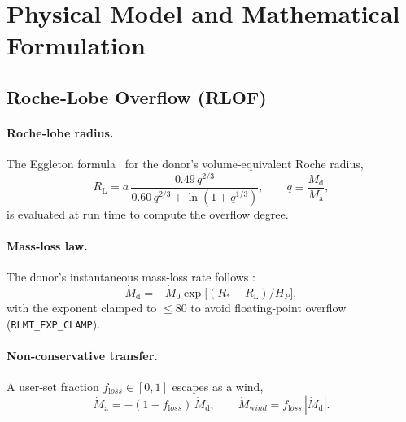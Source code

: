 \documentclass[11pt]{article}
\begin{document}
\section{Physical Model and Mathematical Formulation}

\subsection{Roche‑Lobe Overflow (RLOF)}
\label{sec:RLOF}

\paragraph{Roche‑lobe radius.}
The Eggleton formula~\cite{Eggleton1983} for the donor’s
volume‑equivalent Roche radius,
\begin{equation}
R_{\mathrm L}
 = a\,
   \frac{0.49\,q^{2/3}}{0.60\,q^{2/3}+\ln(1+q^{1/3})},
\qquad
q\equiv\frac{M_{\mathrm d}}{M_{\mathrm a}},
\label{eq:Eggleton}
\end{equation}
is evaluated at run time to compute the overflow degree.

\paragraph{Mass‑loss law.}
The donor’s instantaneous mass‑loss rate follows
\citet{Ritter1988}:
\begin{equation}
\dot M_{\mathrm d}
 = -\dot M_0
   \exp\!\bigl[(R_{*}-R_{\mathrm L})/H_P\bigr],
\label{eq:Ritter}
\end{equation}
with the exponent clamped to $\le80$ to avoid floating‑point overflow
(\texttt{RLMT\_EXP\_CLAMP}).  

\paragraph{Non‑conservative transfer.}
A user‑set fraction $f_{\mathrm loss}\in[0,1]$ escapes as a wind,
\begin{equation}
\dot M_{\mathrm a}=-(1-f_{\mathrm loss})\,\dot M_{\mathrm d},\qquad
\dot M_{\mathrm wind}=f_{\mathrm loss}\,|\dot M_{\mathrm d}|.
\label{eq:noncon}
\end{equation}
\end{document}
